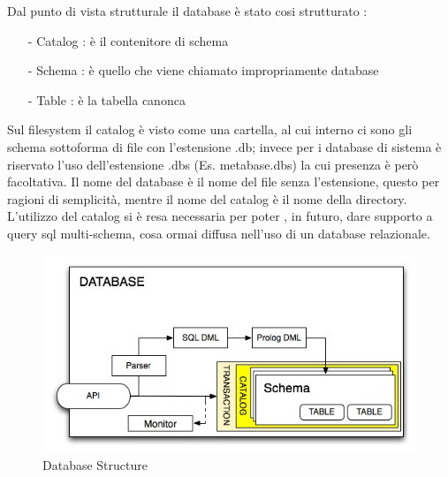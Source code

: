 Dal punto di vista strutturale il database è stato cosi strutturato : 
\begin{itemize}
\item[-] Catalog : è il contenitore di schema
\item[-] Schema : è quello che viene chiamato impropriamente database 
\item[-] Table : è la tabella canonca
\end{itemize}

Sul filesystem il catalog è visto come una cartella, al cui interno ci sono gli schema sottoforma di file con l'estensione .db;  invece per i database di sistema è riservato l'uso dell'estensione .dbs  (Es. metabase.dbs) la cui presenza è però facoltativa. Il nome del database è il nome del file senza l'estensione, questo per ragioni di semplicità, mentre il nome del catalog è il nome della directory. L'utilizzo del catalog si è resa necessaria per poter , in futuro, dare supporto a query sql multi-schema, cosa ormai diffusa nell'uso di un database relazionale. 

\begin{figure}[ht]
\centering
\includegraphics[width=1\textwidth]{immagini/struttura.jpg}
\caption{Database Structure}\label{fig:immagini/struttura.jpg}
\end{figure}
